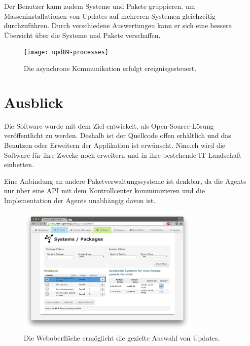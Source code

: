Der Benutzer kann zudem Systeme und Pakete gruppieren, um Masseninstallationen von Updates auf mehreren Systemen gleichzeitig durchzuführen. Durch verschiedene Auswertungen kann er sich eine bessere Übersicht über die Systeme und Pakete verschaffen.

\begin{figure}
  \centering
    \texttt{[image: upd89-processes]}
  \caption{Die asynchrone Kommunikation erfolgt ereignisgesteuert.}
  \label{fig:processes}
\end{figure}

\section*{Ausblick}

Die Software wurde mit dem Ziel entwickelt, als Open-Source-Lösung veröffentlicht zu werden. Deshalb ist der Quellcode offen erhältlich und das Benutzen oder Erweitern der Applikation ist erwünscht. Nine.ch wird die Software für ihre Zwecke noch erweitern und in ihre bestehende IT-Landschaft einbetten.

Eine Anbindung an andere Paketverwaltungssysteme ist denkbar, da die Agents nur über eine API mit dem Kontrollcenter kommunizieren und die Implementation der Agents unabhängig davon ist.

\begin{figure}
  \centering
    \includegraphics[width=0.8\textwidth]{screenshot_comboview}
  \caption{Die Weboberfläche ermöglicht die gezielte Auswahl von Updates.}
  \label{fig:userinterface}
\end{figure}
